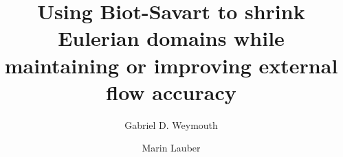 \documentclass[preprint,12pt]{elsarticle}
\begin{document}
\begin{frontmatter}



\title{Using Biot-Savart to shrink Eulerian domains while maintaining or improving external flow accuracy}


\author[inst1]{Gabriel D. Weymouth}
\author[inst1]{Marin Lauber}



\end{frontmatter}
\end{document}
